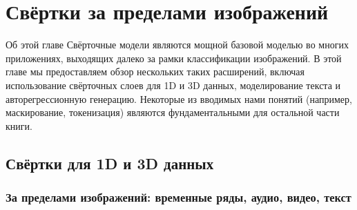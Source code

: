 \chapter{Свёртки за пределами изображений}
\label{chap:convolutions_beyond_images}

\begin{supportbox}{Об этой главе}
Свёрточные модели являются мощной базовой моделью во многих приложениях, выходящих далеко за рамки классификации изображений. В этой главе мы предоставляем обзор нескольких таких расширений, включая использование свёрточных слоев для 1D и 3D данных, моделирование текста и авторегрессионную генерацию. Некоторые из вводимых нами понятий (например, маскирование, токенизация) являются фундаментальными для остальной части книги.
\end{supportbox}

\section{Свёртки для 1D и 3D данных}
\subsection{За пределами изображений: временные ряды, аудио, видео, текст}

